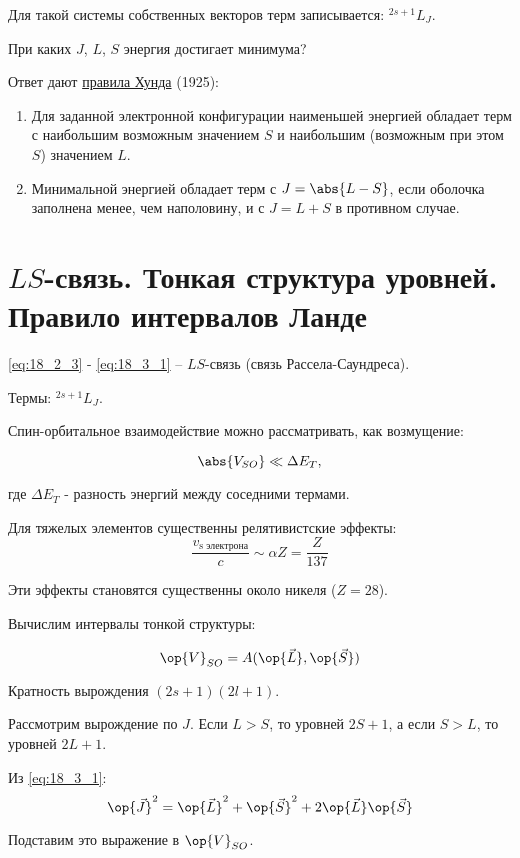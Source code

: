 Для такой системы собственных векторов терм записывается: $\boxed{^{2s+1}L_J}$. 

При каких $J$, $L$, $S$ энергия достигает минимума?

Ответ дают \underline{правила Хунда} (1925):

\begin{enumerate}
\item Для заданной электронной конфигурации наименьшей энергией обладает терм с наибольшим возможным значением $S$ и наибольшим (возможным при этом $S$) значением $L$.
\item Минимальной энергией обладает терм с $J = \abs{L-S}$, если оболочка заполнена менее, чем наполовину, и с $J = L + S$ в противном случае.
\end{enumerate}

\section{$LS$-связь. Тонкая структура уровней. Правило интервалов Ланде}

\eqref{eq:18_2_3} - \eqref{eq:18_3_1} -- $LS$-связь (связь Рассела-Саундреса).

Термы: $^{2s+1}L_J$.

Спин-орбитальное взаимодействие можно рассматривать, как возмущение:

\begin{equation}
\label{eq:18_4_1}
\abs{V_{SO}} \ll \Delta E_T,
\end{equation}

 где $\Delta E_T$ - разность энергий между соседними термами.
 
Для тяжелых элементов существенны релятивистские эффекты:
$$
\frac{v_{\text{s электрона}}}{c} \sim \alpha Z = \frac{Z}{137}
$$

Эти эффекты становятся существенны около никеля ($Z = 28$).

Вычислим интервалы тонкой структуры:

$$
\op{V}_{SO} = A(\op{\vec{L}}, \op{\vec{S}})
$$

Кратность вырождения $(2s + 1)(2l+1)$. 

Рассмотрим вырождение по $J$. Если $L > S$, то уровней $2S+1$, а если $S> L$, то уровней $2L+1$.

Из \eqref{eq:18_3_1}:
$$
\op{\vec{J}}^2 = \op{\vec{L}}^2 + \op{\vec{S}}^2 + 2\op{\vec{L}}\op{\vec{S}}
$$

Подставим это выражение в $\op{V}_{SO}$.

